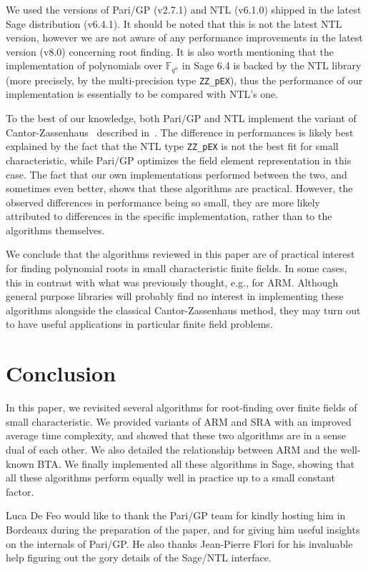 \documentclass{sig-alternate}
\newcommand{\ff}[1]{\mathbb{F}_{#1}}
\newcommand{\qq}{q}
\newcommand{\nn}{n}
\newcommand{\qn}{{\qq^\nn}}
\newcommand{\extf}{\ff{\qn}}
\newcounter{algo}
\renewcommand{\paragraph}[1]{\smallskip\noindent{{\bf \rm #1.}}}
\begin{document}
We used the versions of Pari/GP (v2.7.1) and NTL (v6.1.0) shipped in
the latest Sage distribution (v6.4.1). It should be noted that this is
not the latest NTL version, however we are not aware of any
performance improvements in the latest version (v8.0) concerning root
finding. It is also worth mentioning that the implementation of
polynomials over $\extf$ in Sage 6.4 is backed by the NTL library
(more precisely, by the multi-precision type \texttt{ZZ\_pEX}), thus
the performance of our implementation is essentially to be compared
with NTL's one.

To the best of our knowledge, both Pari/GP and NTL implement the
variant of Cantor-Zassenhaus~\cite{cantor1981} described
in~\cite{GathenS92}. The difference in performances is likely best
explained by the fact that the NTL type \texttt{ZZ\_pEX} is not the
best fit for small characteristic, while Pari/GP optimizes the field
element representation in this case. The fact that our own
implementations performed between the two, and sometimes even better,
shows that these algorithms are practical. However, the observed
differences in performance being so small, they are more likely
attributed to differences in the specific implementation, rather than
to the algorithms themselves.

We conclude that the algorithms reviewed in this paper are of
practical interest for finding polynomial roots in small
characteristic finite fields. In some cases, this in contrast with
what was previously thought, e.g., for ARM. Although general purpose
libraries will probably find no interest in implementing these
algorithms alongside the classical Cantor-Zassenhaus method, they may
turn out to have useful applications in particular finite field
problems.



\section{Conclusion }

In this paper, we revisited several algorithms for root-finding over finite fields of small characteristic. We provided variants of ARM and SRA with an improved average time complexity, and showed that these two algorithms are in a sense dual of each other. We also detailed the relationship between ARM and the well-known BTA. We finally implemented all these algorithms in Sage, showing that all these algorithms perform equally well in practice up to a small constant factor.

\paragraph{Aknowledgements} Luca De Feo would like to thank the
Pari/GP team for kindly hosting him in Bordeaux during the preparation
of the paper, and for giving him useful insights on the internals of
Pari/GP. He also thanks Jean-Pierre Flori for his invaluable help
figuring out the gory details of the Sage/NTL interface.

\scriptsize


\end{document}
